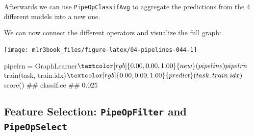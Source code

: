 \documentclass[
  11pt,
  parskip=half,
  DIV=calc,
  BCOR=10mm,
  x11names]{scrbook}
\newenvironment{Shaded}{}{}
\newcommand{\CommentTok}[1]{\textcolor[rgb]{0.00,0.50,0.00}{#1}}
\newcommand{\DataTypeTok}[1]{#1}
\newcommand{\DecValTok}[1]{#1}
\newcommand{\KeywordTok}[1]{\textcolor[rgb]{0.00,0.00,1.00}{#1}}
\newcommand{\NormalTok}[1]{#1}
\newcommand{\OperatorTok}[1]{#1}
\newcommand{\OtherTok}[1]{\textcolor[rgb]{1.00,0.25,0.00}{#1}}
\newcommand{\StringTok}[1]{\textcolor[rgb]{0.00,0.50,0.50}{#1}}
\begin{document}
Afterwards we can use \texttt{PipeOpClassifAvg} to aggregate the predictions from the 4 different models into a new one.

\begin{Shaded}
\end{Shaded}

We can now connect the different operators and visualize the full graph:

\begin{Shaded}
\end{Shaded}

\begin{center}\texttt{[image: mlr3book\_files/figure-latex/04-pipelines-044-1]} \end{center}

\begin{Shaded}
\begin{Highlighting}[]
\NormalTok{pipelrn =}\StringTok{ }\NormalTok{GraphLearner}\OperatorTok{$}\KeywordTok{new}\NormalTok{(pipeline)}
\NormalTok{pipelrn}\OperatorTok{$}\KeywordTok{train}\NormalTok{(task, train.idx)}\OperatorTok{$}\KeywordTok{predict}\NormalTok{(task, train.idx)}\OperatorTok{$}\KeywordTok{score}\NormalTok{()}
\NormalTok{## classif.ce }
\NormalTok{##      0.025}
\end{Highlighting}
\end{Shaded}

\hypertarget{feature-selection-pipeopfilter-and-pipeopselect}{%
\subsection{\texorpdfstring{Feature Selection: \texttt{PipeOpFilter} and \texttt{PipeOpSelect}}{Feature Selection: PipeOpFilter and PipeOpSelect}}\label{feature-selection-pipeopfilter-and-pipeopselect}}
\end{document}
